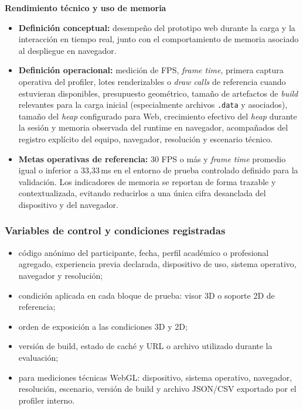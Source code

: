 \textbf{Rendimiento técnico y uso de memoria}
\begin{itemize}
    \item \textbf{Definición conceptual:} desempeño del prototipo web durante la carga y la interacción en tiempo real, junto con el comportamiento de memoria asociado al despliegue en navegador.
    \item \textbf{Definición operacional:} medición de FPS, \textit{frame time}, primera captura operativa del profiler, lotes renderizables o \textit{draw calls} de referencia cuando estuvieran disponibles, presupuesto geométrico, tamaño de artefactos de \textit{build} relevantes para la carga inicial (especialmente archivos \texttt{.data} y asociados), tamaño del \textit{heap} configurado para Web, crecimiento efectivo del \textit{heap} durante la sesión y memoria observada del runtime en navegador, acompañados del registro explícito del equipo, navegador, resolución y escenario técnico.
    \item \textbf{Metas operativas de referencia:} 30 FPS o más y \textit{frame time} promedio igual o inferior a 33,33\,ms en el entorno de prueba controlado definido para la validación. Los indicadores de memoria se reportan de forma trazable y contextualizada, evitando reducirlos a una única cifra desanclada del dispositivo y del navegador.
\end{itemize}

\subsubsection{Variables de control y condiciones registradas}

\begin{itemize}
    \item código anónimo del participante, fecha, perfil académico o profesional agregado, experiencia previa declarada, dispositivo de uso, sistema operativo, navegador y resolución;
    \item condición aplicada en cada bloque de prueba: visor 3D o soporte 2D de referencia;
    \item orden de exposición a las condiciones 3D y 2D;
    \item versión de build, estado de caché y URL o archivo utilizado durante la evaluación;
    \item para mediciones técnicas WebGL: dispositivo, sistema operativo, navegador, resolución, escenario, versión de build y archivo JSON/CSV exportado por el profiler interno.
\end{itemize}


